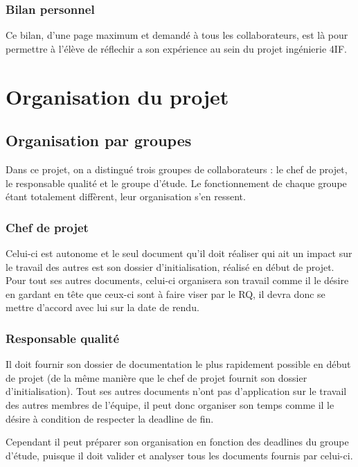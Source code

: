 \documentclass[a4paper, 11pt, draft]{report}
\begin{document}
    \subsection{Bilan personnel}
        Ce bilan, d'une page maximum et demandé à tous les collaborateurs, est là pour permettre à l'élève de réflechir a son expérience au sein du projet ingénierie 4IF.

\chapter{Organisation du projet}

\section{Organisation par groupes}

Dans ce projet, on a distingué trois groupes de collaborateurs : le chef de projet, le responsable qualité et le groupe d'étude. Le fonctionnement de chaque groupe étant totalement diffèrent, leur organisation s'en ressent.

    \subsection{Chef de projet}

Celui-ci est autonome et le seul document qu'il doit réaliser qui ait un impact sur le travail des autres est son dossier d'initialisation, réalisé en début de projet. Pour tout ses autres documents, celui-ci organisera son travail comme il le désire en gardant en tête que ceux-ci sont à faire viser par le RQ, il devra donc se mettre d'accord avec lui sur la date de rendu.

    \subsection{Responsable qualité}

        Il doit fournir son dossier de documentation le plus rapidement possible en début de projet (de la même manière que le chef de projet fournit son dossier d'initialisation). Tout ses autres documents n'ont pas d'application sur le travail des autres membres de l'équipe, il peut donc organiser son temps comme il le désire à condition de respecter la deadline de fin.

        Cependant il peut préparer son organisation en fonction des deadlines du groupe d'étude, puisque il doit valider et analyser tous les documents fournis par celui-ci.
\end{document}
